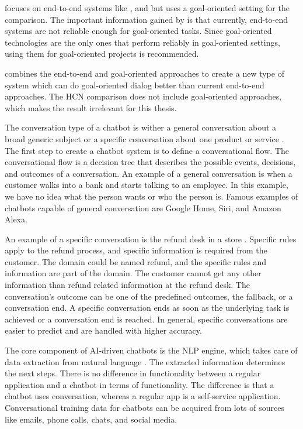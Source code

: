 \citet{bordes2016learning} focuses on end-to-end systems like \citet{evaluateChatbotsShawar2007}, and \citet{williams2017hybrid} but uses a goal-oriented setting for the comparison.
The important information gained by \citet{bordes2016learning} is that currently, end-to-end systems are not reliable enough for goal-oriented tasks.
Since goal-oriented technologies are the only ones that perform reliably in goal-oriented settings, using them for goal-oriented projects is recommended.

\citet{williams2017hybrid} combines the end-to-end and goal-oriented approaches to create a new type of system which can do goal-oriented dialog better than current end-to-end approaches. 
The HCN comparison does not include goal-oriented approaches, which makes the result irrelevant for this thesis.

The conversation type of a chatbot is wither a general conversation about a broad generic subject or a specific conversation about one product or service \citet{singhbuilding}.
The first step to create a chatbot system is to define a conversational flow.
The conversational flow is a decision tree that describes the possible events, decisions, and outcomes of a conversation.
An example of a general conversation is when a customer walks into a bank and starts talking to an employee.
In this example, we have no idea what the person wants or who the person is.
Famous examples of chatbots capable of general conversation are Google Home, Siri, and Amazon Alexa.

An example of a specific conversation is the refund desk in a store \cite{singhbuilding}. 
Specific rules apply to the refund process, and specific information is required from the customer.
The domain could be named refund, and the specific rules and information are part of the domain. 
The customer cannot get any other information than refund related information at the refund desk. 
The conversation's outcome can be one of the predefined outcomes, the fallback, or a conversation end. 
A specific conversation ends as soon as the underlying task is achieved or a conversation end is reached. 
In general, specific conversations are easier to predict and are handled with higher accuracy.

The core component of AI-driven chatbots is the NLP engine, which takes care of data extraction from natural language \cite{singhbuilding}.
The extracted information determines the next steps.
There is no difference in functionality between a regular application and a chatbot in terms of functionality. 
The difference is that a chatbot uses conversation, whereas a regular app is a self-service application. 
Conversational training data for chatbots can be acquired from lots of sources like emails, phone calls, chats, and social media.

